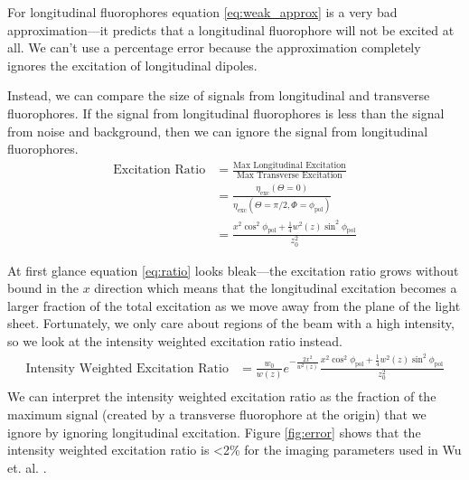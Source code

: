 \documentclass[11pt]{article}
\begin{document}
For longitudinal fluorophores equation \ref{eq:weak_approx} is a very bad
approximation---it predicts that a longitudinal fluorophore will not be excited
at all. We can't use a percentage error because the approximation completely
ignores the excitation of longitudinal dipoles.

Instead, we can compare the size of signals from longitudinal and transverse
fluorophores. If the signal from longitudinal fluorophores is less than the
signal from noise and background, then we can ignore the signal from
longitudinal fluorophores.
\begin{align}
  \text{Excitation Ratio} &= \frac{\text{Max Longitudinal Excitation}}{\text{Max Transverse Excitation}}\\
                          &= \frac{\eta_{\text{exc}}(\Theta = 0)}{\eta_{\text{exc}}(\Theta = \pi/2, \Phi = \phi_{\text{pol}})}\\
                          &= \frac{x^2\cos^2\phi_{\text{pol}} + \frac{1}{4}w^2(z)\sin^2\phi_{\text{pol}}}{z_0^2}\label{eq:ratio}
\end{align}

At first glance equation \ref{eq:ratio} looks bleak---the excitation ratio grows
without bound in the $x$ direction which means that the longitudinal excitation
becomes a larger fraction of the total excitation as we move away from the plane
of the light sheet. Fortunately, we only care about regions of the beam with a
high intensity, so we look at the intensity weighted excitation ratio instead.
\begin{align*}
    \text{Intensity Weighted Excitation Ratio} &= \frac{w_0}{w(z)}e^{-\frac{2x^2}{w^2(z)}}\frac{x^2\cos^2\phi_{\text{pol}} + \frac{1}{4}w^2(z)\sin^2\phi_{\text{pol}}}{z_0^2}\label{eq:intratio} \\
\end{align*}
We can interpret the intensity weighted excitation ratio as the fraction of the
maximum signal (created by a transverse fluorophore at the origin) that we
ignore by ignoring longitudinal excitation. Figure \ref{fig:error} shows that
the intensity weighted excitation ratio is <2\% for the imaging parameters used
in Wu et. al. \cite{wu2013}.

\end{document}
